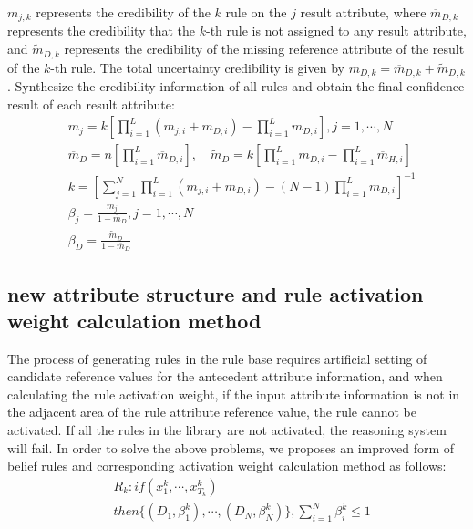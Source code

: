 \documentclass{ieeeaccess}
\begin{document}
$m_{j,k}$ represents the credibility of the $k$ rule on the $j$ result attribute,
where $\overline{m}_{D,k}$ represents the credibility that the $k$-th rule is not assigned to any result attribute,
and $\widetilde{m}_{D,k}$  represents the credibility of the missing reference attribute of the result of the $k$-th rule.
The total uncertainty credibility is given by $m_{D,k}=\overline{m}_{D,k}+\widetilde{m}_{D,k}$.
Synthesize the credibility information of all rules and obtain the final confidence result of each result attribute:
\begin{align}
     & m_j=k[\prod_{i=1}^L(m_{j,i}+m_{D,i})-\prod_{i=1}^Lm_{D,i}],j=1,\cdots,N                                                        \\
     & \overline{m}_D=n[\prod_{i=1}^L\overline{m}_{D,i}],\quad\widetilde{m}_D=k[\prod_{i=1}^Lm_{D,i}-\prod_{i=1}^L\overline{m}_{H,i}] \\
     & k=[\sum_{j=1}^N\prod_{i=1}^L(m_{j,i}+m_{D,i})-(N-1)\prod_{i=1}^Lm_{D,i}]^{-1}                                                  \\
     & \beta_j=\frac{m_j}{1-\overline{m}_D},j=1,\cdots,N                                                                              \\
     & \beta_D=\frac{\widetilde{m}_D}{1-\overline{m}_D}
\end{align}

\subsection{new attribute structure and rule activation weight calculation method}
The process of generating rules in the rule base requires artificial setting of candidate reference values for the antecedent attribute information,
and when calculating the rule activation weight, if the input attribute information is not in the adjacent area of the rule attribute reference value, the rule cannot be activated.
If all the rules in the library are not activated, the reasoning system will fail. In order to solve the above problems, we proposes an improved form of belief rules and corresponding activation weight calculation method as follows:
\begin{equation}
    \begin{split}
        &R_k:if(x_1^k , \cdots , x_{T_k}^k)\\
        &then\{(D_1,\beta_1^k),\cdots,(D_N,\beta_N^k)\},\sum_{i=1}^N\beta_i^k\leq1
    \end{split}
\end{equation}
\end{document}

